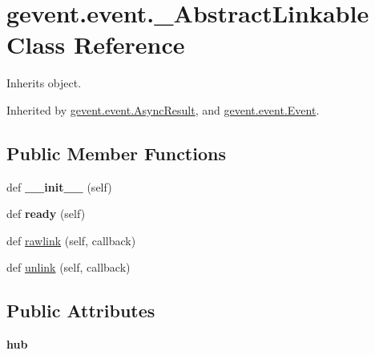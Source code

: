 \hypertarget{classgevent_1_1event_1_1___abstract_linkable}{}\section{gevent.\+event.\+\_\+\+Abstract\+Linkable Class Reference}
\label{classgevent_1_1event_1_1___abstract_linkable}


Inherits object.



Inherited by \hyperlink{classgevent_1_1event_1_1_async_result}{gevent.\+event.\+Async\+Result}, and \hyperlink{classgevent_1_1event_1_1_event}{gevent.\+event.\+Event}.

\subsection*{Public Member Functions}
\begin{DoxyCompactItemize}
\item 
\mbox{\label{classgevent_1_1event_1_1___abstract_linkable_a3b214e070535aa635dab766d2ce1ea2e}} 
def {\bfseries \+\_\+\+\_\+init\+\_\+\+\_\+} (self)
\item 
\mbox{\label{classgevent_1_1event_1_1___abstract_linkable_aba8fb70b44f472d40dfa9cdf47789f0c}} 
def {\bfseries ready} (self)
\item 
def \hyperlink{classgevent_1_1event_1_1___abstract_linkable_a30fd21fc344136be3f3229d9778df4f2}{rawlink} (self, callback)
\item 
def \hyperlink{classgevent_1_1event_1_1___abstract_linkable_a8c8ef1a25db923dbb45ba89110268bef}{unlink} (self, callback)
\end{DoxyCompactItemize}
\subsection*{Public Attributes}
\begin{DoxyCompactItemize}
\item 
\mbox{\label{classgevent_1_1event_1_1___abstract_linkable_a05c61c3a0ccd8f8ab94a1bc17b97caf9}} 
{\bfseries hub}
\end{DoxyCompactItemize}


